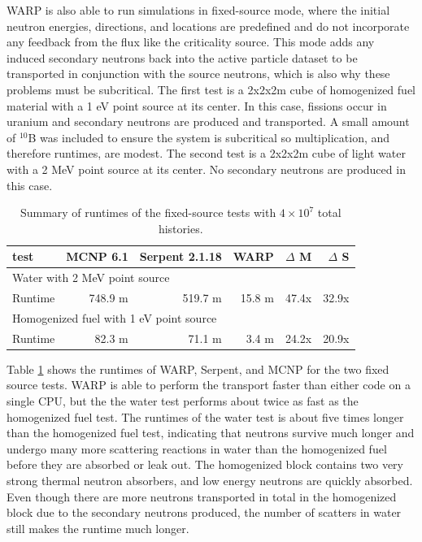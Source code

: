 WARP is also able to run simulations in fixed-source mode, where the initial neutron energies, directions, and locations are predefined and do not incorporate any feedback from the flux like the criticality source.  This mode adds any induced secondary neutrons back into the active particle dataset to be transported in conjunction with the source neutrons, which is also why these problems must be subcritical.   The first test is a 2x2x2m cube of homogenized fuel material with a 1 eV point source at its center.  In this case, fissions occur in uranium and secondary neutrons are produced and transported.  A small amount of $^{10}$B was included to ensure the system is subcritical so multiplication, and therefore runtimes, are modest.   The second test is a 2x2x2m cube of light water with a 2 MeV point source at its center.   No secondary neutrons are produced in this case.

\begin{table}[h]
\centering
\caption{Summary of runtimes of the fixed-source tests with $4\times10^7$ total histories.}
\label{fixed_summary}
\begin{tabular}{| l | r | r | r | r | r |}
 \hline
 test & MCNP 6.1 & Serpent 2.1.18 & WARP & $\Delta$ M & $\Delta$ S  \\
\hline
\hline
\multicolumn{6}{|l|}{Water with 2 MeV point source }  \\
\hline
 Runtime               &  748.9 m & 519.7 m & 15.8 m & 47.4x  & 32.9x  \\
 \hline
 \hline
\multicolumn{6}{|l|}{Homogenized fuel with 1 eV point source }\\
\hline
 Runtime               &  82.3 m &  71.1 m &  3.4 m & 24.2x  & 20.9x  \\
 \hline
\end{tabular}
\end{table}

Table \ref{fixed_summary} shows the runtimes of WARP, Serpent, and MCNP for the two fixed source tests.  WARP is able to perform the transport faster than either code on a single CPU, but the the water test performs about twice as fast as the homogenized fuel test.  The runtimes of the water test is about five times longer than the homogenized fuel test, indicating that neutrons survive much longer and undergo many more scattering reactions in water than the homogenized fuel before they are absorbed or leak out.  The homogenized block contains two very strong thermal neutron absorbers, and low energy neutrons are quickly absorbed.  Even though there are more neutrons transported in total in the homogenized block due to the secondary neutrons produced, the number of scatters in water still makes the runtime much longer.

